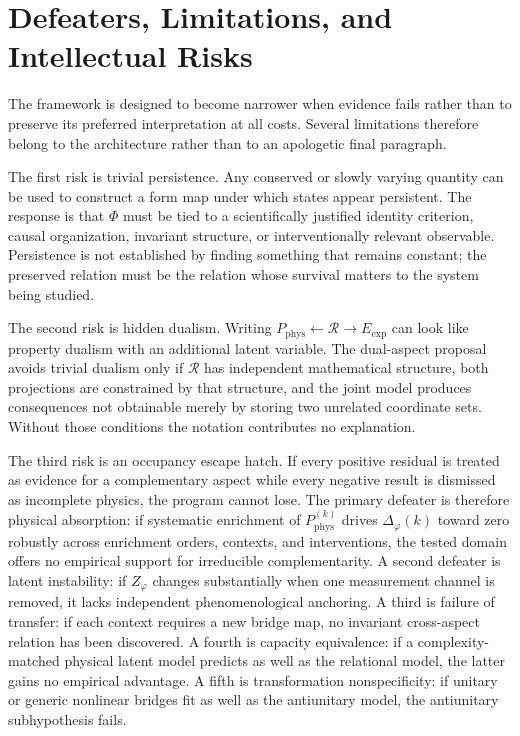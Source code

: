 \chapter{Defeaters, Limitations, and Intellectual Risks}

The framework is designed to become narrower when evidence fails rather than to preserve its preferred interpretation at all costs. Several limitations therefore belong to the architecture rather than to an apologetic final paragraph.

The first risk is trivial persistence. Any conserved or slowly varying quantity can be used to construct a form map under which states appear persistent. The response is that $\Phi$ must be tied to a scientifically justified identity criterion, causal organization, invariant structure, or interventionally relevant observable. Persistence is not established by finding something that remains constant; the preserved relation must be the relation whose survival matters to the system being studied.

The second risk is hidden dualism. Writing $P_{\mathrm{phys}}\leftarrow\mathscr R\rightarrow E_{\mathrm{exp}}$ can look like property dualism with an additional latent variable. The dual-aspect proposal avoids trivial dualism only if $\mathscr R$ has independent mathematical structure, both projections are constrained by that structure, and the joint model produces consequences not obtainable merely by storing two unrelated coordinate sets. Without those conditions the notation contributes no explanation.

The third risk is an occupancy escape hatch. If every positive residual is treated as evidence for a complementary aspect while every negative result is dismissed as incomplete physics, the program cannot lose. The primary defeater is therefore physical absorption: if systematic enrichment of $P_{\mathrm{phys}}^{(k)}$ drives $\Delta_\varphi(k)$ toward zero robustly across enrichment orders, contexts, and interventions, the tested domain offers no empirical support for irreducible complementarity. A second defeater is latent instability: if $Z_\varphi$ changes substantially when one measurement channel is removed, it lacks independent phenomenological anchoring. A third is failure of transfer: if each context requires a new bridge map, no invariant cross-aspect relation has been discovered. A fourth is capacity equivalence: if a complexity-matched physical latent model predicts as well as the relational model, the latter gains no empirical advantage. A fifth is transformation nonspecificity: if unitary or generic nonlinear bridges fit as well as the antiunitary model, the antiunitary subhypothesis fails.

